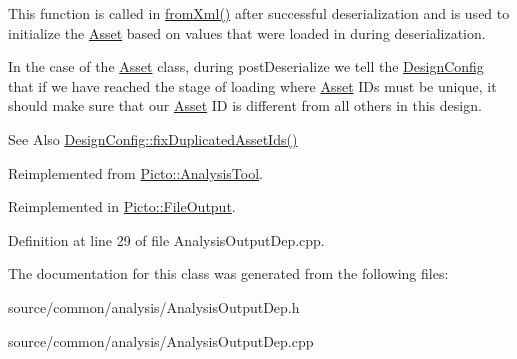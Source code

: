 This function is called in \hyperlink{class_picto_1_1_asset_a8bed4da09ecb1c07ce0dab313a9aba67}{from\-Xml()} after successful deserialization and is used to initialize the \hyperlink{class_picto_1_1_asset}{Asset} based on values that were loaded in during deserialization. 

In the case of the \hyperlink{class_picto_1_1_asset}{Asset} class, during post\-Deserialize we tell the \hyperlink{class_picto_1_1_design_config}{Design\-Config} that if we have reached the stage of loading where \hyperlink{class_picto_1_1_asset}{Asset} I\-Ds must be unique, it should make sure that our \hyperlink{class_picto_1_1_asset}{Asset} I\-D is different from all others in this design. \begin{DoxySeeAlso}{See Also}
\hyperlink{class_picto_1_1_design_config_ab57e0738b97e4358ab09530cd6815fc0}{Design\-Config\-::fix\-Duplicated\-Asset\-Ids()} 
\end{DoxySeeAlso}


Reimplemented from \hyperlink{class_picto_1_1_analysis_tool_a4e222c101573aca1ef0e271fab078eaa}{Picto\-::\-Analysis\-Tool}.



Reimplemented in \hyperlink{class_picto_1_1_file_output_a1bcc204b235bc36066ef69595e390602}{Picto\-::\-File\-Output}.



Definition at line 29 of file Analysis\-Output\-Dep.\-cpp.



The documentation for this class was generated from the following files\-:\begin{DoxyCompactItemize}
\item 
source/common/analysis/Analysis\-Output\-Dep.\-h\item 
source/common/analysis/Analysis\-Output\-Dep.\-cpp\end{DoxyCompactItemize}

